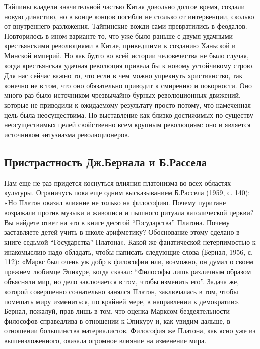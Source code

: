 Тайпины владели значительной частью Китая довольно долгое время,
создали новую династию, но в конце концов погибли не столько от
интервенции, сколько от внутреннего разложения. Тайпинские вожди сами
превратились в феодалов. Повторилось в ином варианте то, что уже было
раньше с двумя удачными крестьянскими революциями в Китае, приведшими
к созданию Ханьской и Минской империй. Но как будто во всей истории
человечества не было случая, когда крестьянская удачная революция
привела бы к новому устойчивому строю. Для нас сейчас важно то, что
если в чем можно упрекнуть христианство, так конечно не в том, что оно
обязательно приводит к смирению и покорности. Оно много раз было
источником чрезвычайно бурных революционных движений, которые не
приводили к ожидаемому результату просто потому, что намеченная цель
была неосуществима. Но выставление как близко достижимых по существу
неосуществимых целей свойственно всем крупным революциям: оно и
является источником энтузиазма революционеров.

\subsection{Пристрастность Дж.Бернала и Б.Рассела}

Нам еще не раз придется коснуться влияния платонизма во всех областях
культуры. Ограничусь пока еще одним высказыванием Б.Рассела (1959, с.
140): «Но Платон оказал влияние не только на философию. Почему
пуритане возражали против музыки и живописи и пышного ритуала
католической церкви? Вы найдете ответ на это в книге десятой
``Государства'' Платона. Почему заставляете детей учить в школе
арифметику? Обоснование этому сделано в книге седьмой ``Государства''
Платона». Какой же фанатической нетерпимостью к инакомыслию надо
обладать, чтобы написать следующие слова (Бернал, 1956, с. 112):
«Маркс был очень уж добр к философии или, возможно, он думал о своем
прежнем любимце Эпикуре, когда сказал: ``Философы лишь различным
образом объясняли мир, но дело заключается в том, чтобы изменить
его''. Задача же, которой совершенно сознательно занялся Платон,
заключалась в том, чтобы помешать миру измениться, по крайней мере, в
направлении к демократии». Бернал, пожалуй, прав лишь в том, что
оценка Марксом бездеятельности философов справедлива в отношении к
Эпикуру и, как увидим дальше, в отношении большинства материалистов.
Философия же Платона, как ясно уже из вышеизложенного, оказала
огромное влияние на изменение мира.

